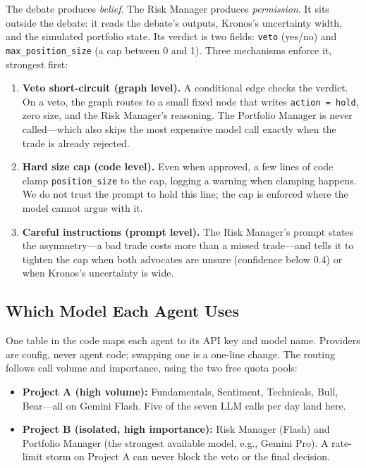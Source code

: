 \documentclass[conference]{IEEEtran}
\begin{document}
The debate produces \emph{belief}. The Risk Manager produces \emph{permission}. It sits outside the debate: it reads the debate's outputs, Kronos's uncertainty width, and the simulated portfolio state. Its verdict is two fields: \texttt{veto} (yes/no) and \texttt{max\_position\_size} (a cap between 0 and 1). Three mechanisms enforce it, strongest first:

\begin{enumerate}[leftmargin=*,itemsep=1pt,topsep=2pt]
  \item \textbf{Veto short-circuit (graph level).} A conditional edge checks the verdict. On a veto, the graph routes to a small fixed node that writes \texttt{action = hold}, zero size, and the Risk Manager's reasoning. The Portfolio Manager is never called---which also skips the most expensive model call exactly when the trade is already rejected.
  \item \textbf{Hard size cap (code level).} Even when approved, a few lines of code clamp \texttt{position\_size} to the cap, logging a warning when clamping happens. We do not trust the prompt to hold this line; the cap is enforced where the model cannot argue with it.
  \item \textbf{Careful instructions (prompt level).} The Risk Manager's prompt states the asymmetry---a bad trade costs more than a missed trade---and tells it to tighten the cap when both advocates are unsure (confidence below 0.4) or when Kronos's uncertainty is wide.
\end{enumerate}

\subsection{Which Model Each Agent Uses}

One table in the code maps each agent to its API key and model name. Providers are config, never agent code; swapping one is a one-line change. The routing follows call volume and importance, using the two free quota pools:

\begin{itemize}[leftmargin=*,itemsep=1pt,topsep=2pt]
  \item \textbf{Project A (high volume):} Fundamentals, Sentiment, Technicals, Bull, Bear---all on Gemini Flash. Five of the seven LLM calls per day land here.
  \item \textbf{Project B (isolated, high importance):} Risk Manager (Flash) and Portfolio Manager (the strongest available model, e.g., Gemini Pro). A rate-limit storm on Project A can never block the veto or the final decision.
\end{itemize}
\end{document}
